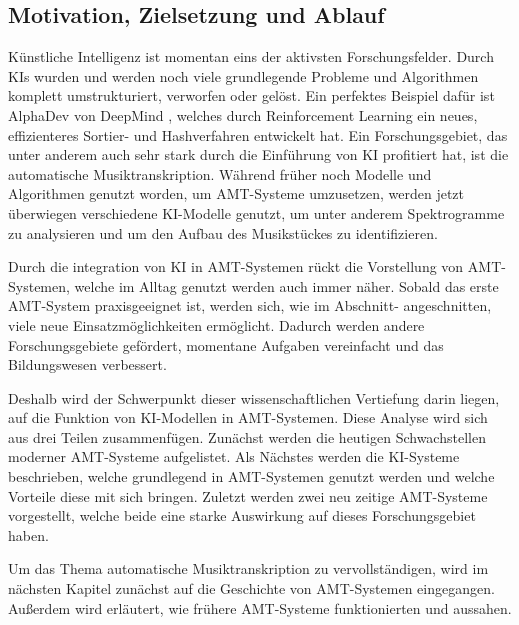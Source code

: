 \subsection{Motivation, Zielsetzung und Ablauf}
Künstliche Intelligenz ist momentan eins der aktivsten Forschungsfelder.
Durch KIs wurden und werden noch viele grundlegende Probleme
und Algorithmen komplett umstrukturiert, verworfen oder gelöst.
Ein perfektes Beispiel dafür ist AlphaDev von DeepMind \cite{mankowitz2023faster},
welches durch Reinforcement Learning ein neues, effizienteres Sortier- und Hashverfahren entwickelt hat.
Ein Forschungsgebiet, das unter anderem auch sehr stark durch die Einführung von KI profitiert hat,
ist die automatische Musiktranskription.
Während früher noch Modelle und Algorithmen genutzt worden, um AMT-Systeme umzusetzen,
werden jetzt überwiegen verschiedene KI-Modelle genutzt,
um unter anderem Spektrogramme zu analysieren und um den Aufbau des Musikstückes zu identifizieren.

Durch die integration von KI in AMT-Systemen rückt die Vorstellung von AMT-Systemen,
welche im Alltag genutzt werden auch immer näher.
Sobald das erste AMT-System praxisgeeignet ist, werden sich, wie im Abschnitt- angeschnitten,
viele neue Einsatzmöglichkeiten ermöglicht.
Dadurch werden andere Forschungsgebiete gefördert, momentane Aufgaben vereinfacht und das Bildungswesen verbessert.

Deshalb wird der Schwerpunkt dieser wissenschaftlichen Vertiefung darin liegen,
auf die Funktion von KI-Modellen in AMT-Systemen.
Diese Analyse wird sich aus drei Teilen zusammenfügen.
Zunächst werden die heutigen Schwachstellen moderner AMT-Systeme aufgelistet.
Als Nächstes werden die KI-Systeme beschrieben,
welche grundlegend in AMT-Systemen genutzt werden und welche Vorteile diese mit sich bringen.
Zuletzt werden zwei neu zeitige AMT-Systeme vorgestellt,
welche beide eine starke Auswirkung auf dieses Forschungsgebiet haben.

Um das Thema automatische Musiktranskription zu vervollständigen,
wird im nächsten Kapitel zunächst auf die Geschichte von AMT-Systemen eingegangen.
Außerdem wird erläutert, wie frühere AMT-Systeme funktionierten und aussahen.